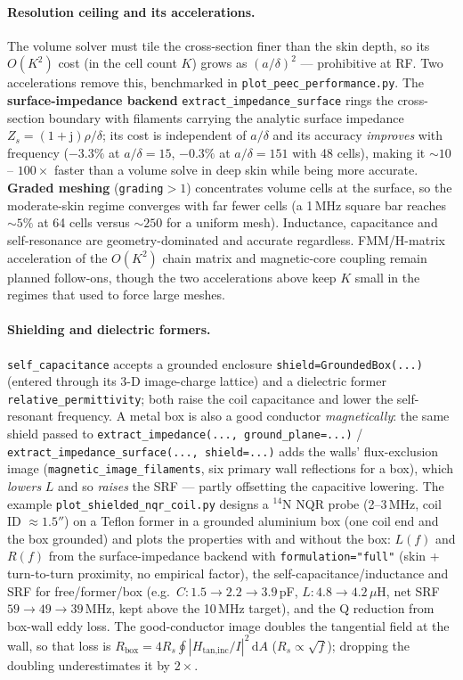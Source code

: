 \documentclass[11pt,oneside]{report}
\newcommand{\code}[1]{\texttt{#1}}
\begin{document}
\paragraph{Resolution ceiling and its accelerations.} The volume solver must tile the
cross-section finer than the skin depth, so its \(O(K^2)\) cost (in the cell count \(K\))
grows as \((a/\delta)^2\) --- prohibitive at RF. Two accelerations remove this, benchmarked
in \code{plot\_peec\_performance.py}. The \textbf{surface-impedance backend}
\code{extract\_impedance\_surface} rings the cross-section boundary with filaments carrying
the analytic surface impedance \(Z_s=(1+\mathrm j)\rho/\delta\); its cost is independent of
\(a/\delta\) and its accuracy \emph{improves} with frequency (\(-3.3\%\) at
\(a/\delta=15\), \(-0.3\%\) at \(a/\delta=151\) with 48 cells), making it \(\sim\!10\)--
\(100\times\) faster than a volume solve in deep skin while being more accurate.
\textbf{Graded meshing} (\code{grading}\(>1\)) concentrates volume cells at the surface, so
the moderate-skin regime converges with far fewer cells (a 1\,MHz square bar reaches
\(\sim\!5\%\) at 64 cells versus \(\sim\!250\) for a uniform mesh). Inductance, capacitance
and self-resonance are geometry-dominated and accurate regardless. FMM/H-matrix acceleration
of the \(O(K^2)\) chain matrix and magnetic-core coupling remain planned follow-ons, though
the two accelerations above keep \(K\) small in the regimes that used to force large meshes.

\paragraph{Shielding and dielectric formers.} \code{self\_capacitance} accepts a grounded
enclosure \code{shield=GroundedBox(...)} (entered through its 3-D image-charge lattice) and a
dielectric former \code{relative\_permittivity}; both raise the coil capacitance and lower
the self-resonant frequency. A metal box is also a good conductor \emph{magnetically}: the
same shield passed to \code{extract\_impedance(..., ground\_plane=...)} /
\code{extract\_impedance\_surface(..., shield=...)} adds the walls' flux-exclusion image
(\code{magnetic\_image\_filaments}, six primary wall reflections for a box), which
\emph{lowers} \(L\) and so \emph{raises} the SRF --- partly offsetting the capacitive
lowering. The example \code{plot\_shielded\_nqr\_coil.py} designs a
\(^{14}\)N NQR probe (2--3\,MHz, coil ID \(\approx1.5''\)) on a Teflon former in a grounded
aluminium box (one coil end and the box grounded) and plots the properties with and without
the box: \(L(f)\) and \(R(f)\) from the surface-impedance backend with
\code{formulation="full"} (skin + turn-to-turn proximity, no empirical factor), the
self-capacitance/inductance and SRF for free/former/box (e.g.\ \(C:1.5\to2.2\to3.9\)\,pF,
\(L:4.8\to4.2\)\,\(\mu\)H, net SRF \(59\to49\to39\)\,MHz, kept above the 10\,MHz target), and
the Q reduction from box-wall eddy loss. The good-conductor image doubles the tangential
field at the wall, so that loss is
\(R_{\text{box}}=4R_s\!\oint|H_{\text{tan,inc}}/I|^2\,\mathrm dA\) (\(R_s\propto\sqrt f\));
dropping the doubling underestimates it by \(2\times\).
\end{document}
